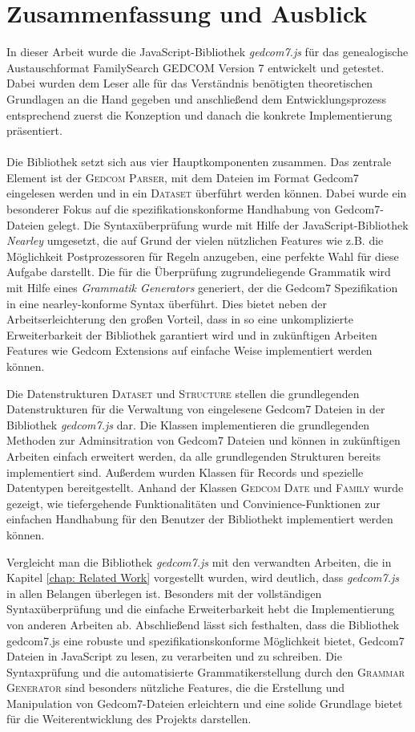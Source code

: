 \chapter{Zusammenfassung und Ausblick}
\label{chap: Zusammenfassung und Ausblick}
In dieser Arbeit wurde die JavaScript-Bibliothek \textit{gedcom7.js} für das genealogische Austauschformat FamilySearch GEDCOM Version 7 entwickelt und getestet. Dabei wurden dem Leser alle für das Verständnis benötigten theoretischen Grundlagen an die Hand gegeben und anschließend dem Entwicklungsprozess entsprechend zuerst die Konzeption und danach die konkrete Implementierung präsentiert. 
\\ \\
Die Bibliothek setzt sich aus vier Hauptkomponenten zusammen. Das zentrale Element ist der \textsc{Gedcom Parser}, mit dem Dateien im Format Gedcom7 eingelesen werden und in ein \textsc{Dataset} überführt werden können.
Dabei wurde ein besonderer Fokus auf die spezifikationskonforme Handhabung von Gedcom7-Dateien gelegt. Die Syntaxüberprüfung wurde mit Hilfe der JavaScript-Bibliothek \textit{Nearley} umgesetzt, die auf Grund der vielen nützlichen Features wie z.B. die Möglichkeit Postprozessoren für Regeln anzugeben, eine perfekte Wahl für diese Aufgabe darstellt. Die für die Überprüfung zugrundeliegende Grammatik wird mit Hilfe eines \textit{Grammatik Generators} generiert, der die Gedcom7 Spezifikation in eine nearley-konforme Syntax überführt. Dies bietet neben der Arbeitserleichterung den großen Vorteil, dass in so eine unkomplizierte Erweiterbarkeit der Bibliothek garantiert wird und in zukünftigen Arbeiten Features wie Gedcom Extensions auf einfache Weise implementiert werden können. 


Die Datenstrukturen \textsc{Dataset} und \textsc{Structure} stellen die grundlegenden Datenstrukturen für die Verwaltung von eingelesene Gedcom7 Dateien in der Bibliothek \textit{gedcom7.js} dar. Die Klassen implementieren die grundlegenden Methoden zur Adminsitration von Gedcom7 Dateien und können in zukünftigen Arbeiten einfach erweitert werden, da alle grundlegenden Strukturen bereits implementiert sind. Außerdem wurden Klassen für Records und spezielle Datentypen bereitgestellt. Anhand der Klassen \textsc{Gedcom Date} und \textsc{Family} wurde gezeigt, wie tiefergehende Funktionalitäten und Convinience-Funktionen zur einfachen Handhabung für den Benutzer der Bibliothekt implementiert werden können. 


Vergleicht man die Bibliothek \textit{gedcom7.js} mit den verwandten Arbeiten, die in Kapitel \ref{chap: Related Work} vorgestellt wurden, wird deutlich, dass \textit{gedcom7.js} in allen Belangen überlegen ist. Besonders mit der vollständigen Syntaxüberprüfung und die einfache Erweiterbarkeit hebt die Implementierung von anderen Arbeiten ab. 
\newpage
{
\noindent
Abschließend lässt sich festhalten, dass die Bibliothek gedcom7.js eine robuste und spezifikationskonforme Möglichkeit bietet, Gedcom7 Dateien in JavaScript zu lesen, zu verarbeiten und zu schreiben. Die Syntaxprüfung und die automatisierte Grammatikerstellung durch den \textsc{Grammar Generator} sind besonders nützliche Features, die die Erstellung und Manipulation von Gedcom7-Dateien erleichtern und eine solide Grundlage bietet für die Weiterentwicklung des Projekts darstellen.
}